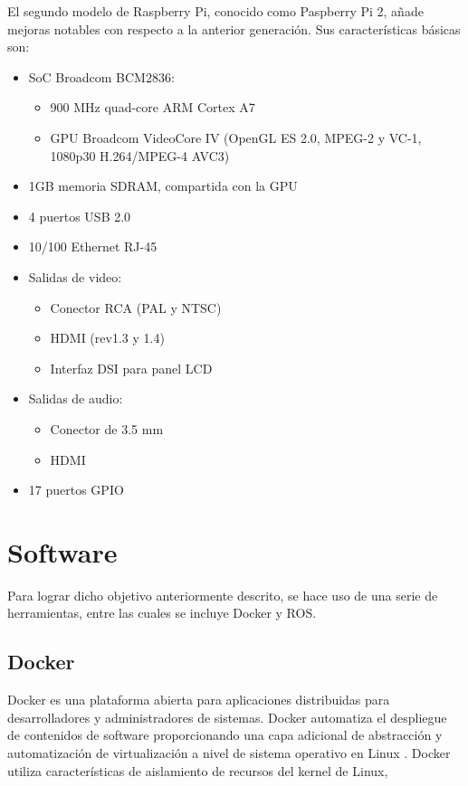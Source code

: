 	El segundo modelo de Raspberry Pi, conocido como Paspberry Pi 2, añade mejoras notables con respecto a la anterior generación. Sus características básicas son:
	
	\begin{itemize}
		\item SoC Broadcom BCM2836:
			\begin{itemize}
				\item 900 MHz quad-core ARM Cortex A7
				\item GPU Broadcom VideoCore IV (OpenGL ES 2.0, MPEG-2 y VC-1, 1080p30 H.264/MPEG-4 AVC3)
			\end{itemize}
		\item 1GB memoria SDRAM, compartida con la GPU
		\item 4 puertos USB 2.0
		\item 10/100 Ethernet RJ-45
		\item Salidas de video:
		\begin{itemize}
			\item Conector RCA (PAL y NTSC)
			\item HDMI (rev1.3 y 1.4)
			\item Interfaz DSI para panel LCD
		\end{itemize}
		\item Salidas de audio:
		\begin{itemize}
			\item Conector de 3.5 mm
			\item HDMI
		\end{itemize}
		\item 17 puertos GPIO
	\end{itemize}
	

\section{Software}
Para lograr dicho objetivo anteriormente descrito, se hace uso de una serie de herramientas, entre las cuales se incluye Docker y ROS.

	\subsection{Docker}
	Docker es una plataforma abierta para aplicaciones distribuidas para desarrolladores y administradores de sistemas\cite{docker-web}. Docker automatiza el despliegue de contenidos de software proporcionando una capa adicional de abstracción y automatización de virtualización a nivel de sistema operativo en Linux \cite{docker-wikipedia}. Docker utiliza características de aislamiento de recursos del kernel de Linux, 
	
